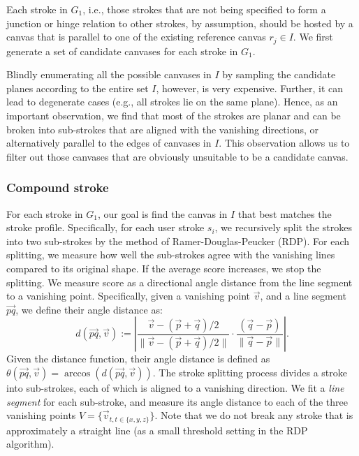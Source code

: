 {Each stroke in $G_1$, i.e., those strokes that are not being specified to form a junction or hinge relation to other strokes, by assumption, should be hosted by a canvas that is parallel to one of the existing reference canvas $r_j \in I$. We first generate a set of candidate canvases for each stroke in $G_1$.

Blindly enumerating all the possible canvases in $I$ by sampling the candidate planes according to the entire set $I$, however, is very expensive. Further, it can lead to degenerate cases (e.g., all strokes lie on the same plane). Hence, as an important observation, we find that most of the strokes are planar and can be broken into sub-strokes that are aligned with the vanishing directions, or alternatively parallel to the edges of canvases in $I$. This observation allows us to filter out those canvases that are obviously unsuitable to be a candidate canvas.

\subsubsection{Compound stroke}

For each stroke in $G_1$, our goal is find the canvas in $I$ that best matches the stroke profile. Specifically, for each user stroke $s_i$, we recursively split the strokes into two sub-strokes by the method of Ramer-Douglas-Peucker (RDP). For each splitting, we measure how well the sub-strokes agree with the vanishing lines compared to its original shape. If the average score increases, we stop the splitting. We measure score as a directional angle distance from the line segment to a vanishing point. Specifically, given a vanishing point $\vec{v}$, and a line segment $\vec{pq}$, we define their angle distance as:
%
\begin{equation}
d(\vec{pq}, \vec{v}) := {\left| \frac{\vec{v} - (\vec{p}+\vec{q})/2}{\| \vec{v} - (\vec{p}+\vec{q})/2 \|} \cdot  {\frac{(\vec{q}-\vec{p})}{\|\vec{q}-\vec{p}\|}}\right|}.
\end{equation}
%
Given the distance function, their angle distance is defined as $\theta(\vec{pq}, \vec{v}) = \arccos(d(\vec{pq}, \vec{v}))$. The stroke splitting process divides a stroke into sub-strokes, each of which is aligned to a vanishing direction. We fit a \emph{line segment} for each sub-stroke, and measure its angle distance to each of the three vanishing points $V=\{\vec{v}_{t, t \in \{x,y,z\}}\}$. Note that we do not break any stroke that is approximately a straight line (as a small threshold setting in the RDP algorithm).



}
